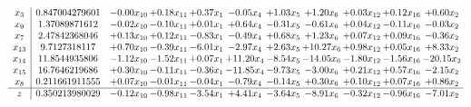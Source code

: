 \documentclass[9pt]{article}
\begin{document}
\[\begin{array}{c| c c@{\hskip 2pt} c@{\hskip 2pt} c@{\hskip 2pt} c@{\hskip 2pt} c@{\hskip 2pt} c@{\hskip 2pt} c@{\hskip 2pt} c@{\hskip 2pt} c@{\hskip 2pt} }
 x_{3}   &  0.847004279601 & -0.00 x_{10} & +  0.18 x_{11} & +  0.37 x_{1} & -0.05 x_{4} & +  1.03 x_{5} & +  1.20 x_{6} & +  0.03 x_{12} & +  0.12 x_{16} & +  0.60 x_{2}\\
 x_{9}   &  1.37089871612 & -0.02 x_{10} & -0.10 x_{11} & +  0.01 x_{1} & +  0.64 x_{4} & -0.31 x_{5} & -0.61 x_{6} & +  0.04 x_{12} & -0.11 x_{16} & -0.03 x_{2}\\
 x_{7}   &  2.47842368046 & +  0.13 x_{10} & +  0.12 x_{11} & -0.83 x_{1} & -0.49 x_{4} & +  0.68 x_{5} & +  1.23 x_{6} & +  0.07 x_{12} & +  0.09 x_{16} & -0.36 x_{2}\\
 x_{13}   &  9.7127318117 & +  0.70 x_{10} & -0.39 x_{11} & -6.01 x_{1} & -2.97 x_{4} & +  2.63 x_{5} & + 10.27 x_{6} & +  0.98 x_{12} & +  0.05 x_{16} & +  8.33 x_{2}\\
 x_{14}   &  11.8544935806 & -1.12 x_{10} & -1.52 x_{11} & +  0.07 x_{1} & + 11.20 x_{4} & -8.54 x_{5} & -14.05 x_{6} & -1.80 x_{12} & -1.56 x_{16} & -20.15 x_{2}\\
 x_{15}   &  16.7646219686 & +  0.30 x_{10} & -0.11 x_{11} & -0.36 x_{1} & -11.85 x_{4} & -9.73 x_{5} & -3.00 x_{6} & +  0.21 x_{12} & +  0.57 x_{16} & -2.15 x_{2}\\
 x_{8}   &  0.211661911555 & +  0.07 x_{10} & -0.01 x_{11} & -0.04 x_{1} & -0.79 x_{4} & -0.14 x_{5} & +  0.30 x_{6} & +  0.10 x_{12} & +  0.07 x_{16} & +  0.86 x_{2}\\
\hline
z    &  0.350213980029 & -0.12 x_{10} & -0.98 x_{11} & -3.54 x_{1} & +  4.41 x_{4} & -3.64 x_{5} & -8.91 x_{6} & -0.32 x_{12} & -0.96 x_{16} & -7.01 x_{2}\\
\end{array}\]
\end{document}
